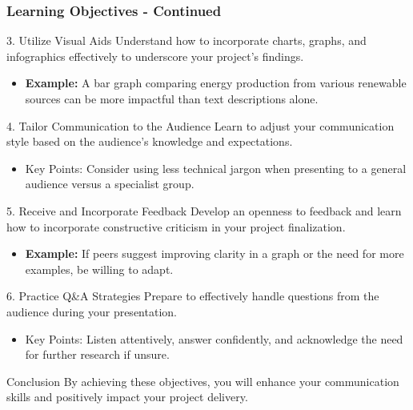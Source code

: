 \documentclass{beamer}
\begin{document}
\begin{frame}[fragile]
    \frametitle{Learning Objectives - Continued}
    \begin{block}{3. Utilize Visual Aids}
        Understand how to incorporate charts, graphs, and infographics effectively to underscore your project’s findings.
        \begin{itemize}
            \item \textbf{Example:} A bar graph comparing energy production from various renewable sources can be more impactful than text descriptions alone.
        \end{itemize}
    \end{block}

    \begin{block}{4. Tailor Communication to the Audience}
        Learn to adjust your communication style based on the audience's knowledge and expectations.
        \begin{itemize}
            \item Key Points: Consider using less technical jargon when presenting to a general audience versus a specialist group.
        \end{itemize}
    \end{block}

    \begin{block}{5. Receive and Incorporate Feedback}
        Develop an openness to feedback and learn how to incorporate constructive criticism in your project finalization.
        \begin{itemize}
            \item \textbf{Example:} If peers suggest improving clarity in a graph or the need for more examples, be willing to adapt.
        \end{itemize}
    \end{block}

    \begin{block}{6. Practice Q\&A Strategies}
        Prepare to effectively handle questions from the audience during your presentation.
        \begin{itemize}
            \item Key Points: Listen attentively, answer confidently, and acknowledge the need for further research if unsure.
        \end{itemize}
    \end{block}

    \begin{block}{Conclusion}
        By achieving these objectives, you will enhance your communication skills and positively impact your project delivery.
    \end{block}
\end{frame}
\end{document}
